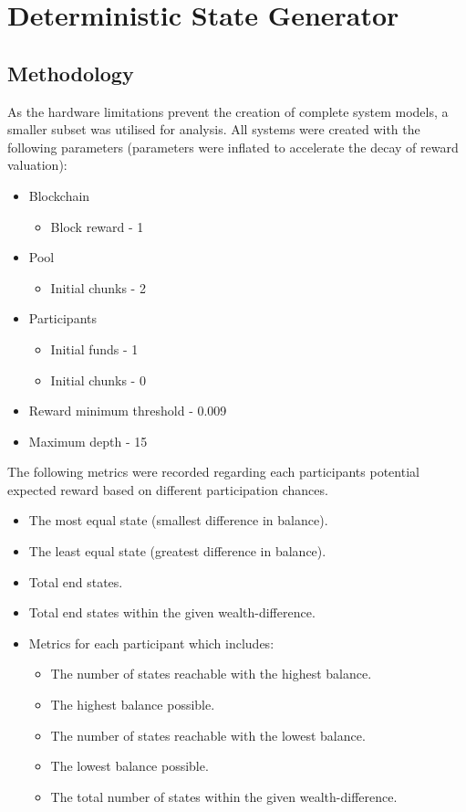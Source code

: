 \section{Deterministic State Generator}

\subsection{Methodology}

As the hardware limitations prevent the creation of complete system models, a smaller subset was utilised for analysis. All systems were created with the following parameters (parameters were inflated to accelerate the decay of reward valuation):

\begin{itemize}
    \item Blockchain 
    \begin{itemize}
        \item Block reward - 1
    \end{itemize}  
    \item Pool 
    \begin{itemize}
        \item Initial chunks - 2
    \end{itemize}
    \item Participants
    \begin{itemize}
        \item Initial funds - 1
        \item Initial chunks - 0
    \end{itemize}
    \item Reward minimum threshold - 0.009
    \item Maximum depth - 15
\end{itemize}

The following metrics were recorded regarding each participants potential expected reward based on different participation chances.

\begin{itemize}
    \item The most equal state (smallest difference in balance).
    \item The least equal state (greatest difference in balance).
    \item Total end states.
    \item Total end states within the given wealth-difference.
    \item Metrics for each participant which includes:
    \begin{itemize}
        \item The number of states reachable with the highest balance.
        \item The highest balance possible.
        \item The number of states reachable with the lowest balance.
        \item The lowest balance possible.
        \item The total number of states within the given wealth-difference.
    \end{itemize}
\end{itemize}

